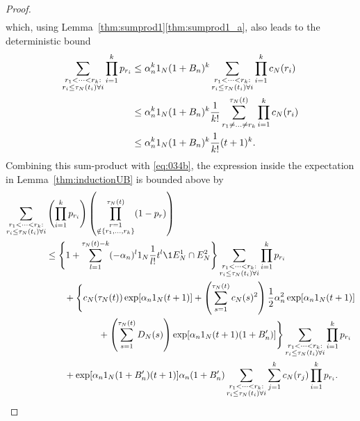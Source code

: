 \begin{proof}
\begin{align}
\end{align}
which, using Lemma~\ref{thm:sumprod1}\ref{thm:sumprod1_a}, also leads to the deterministic bound
\begin{align}
\sum_{\substack{r_1 <\dots< r_k :\\ r_i \leq \tau_N(t_i) \forall i}}
        \prod_{i=1}^k p_{r_i}
&\leq \alpha_n^k 1_N (1 + B_n)^k
        \sum_{\substack{r_1 <\dots< r_k :\\ r_i \leq \tau_N(t_i) \forall i}}
        \prod_{i=1}^k c_N(r_i) \notag\\
&\leq \alpha_n^k 1_N (1 + B_n)^k \frac{1}{k!}
        \sum_{r_1 \neq \dots\neq r_k}^{\tau_N(t)} 
        \prod_{i=1}^k c_N(r_i) \notag\\
&\leq \alpha_n^k 1_N (1 + B_n)^k \frac{1}{k!} (t+1)^k. 
        \label{eq:037}
\end{align}
Combining this sum-product with \eqref{eq:034b}, the expression inside the expectation in Lemma~\ref{thm:inductionUB} is bounded above by
\begin{align*}
\sum_{\substack{r_1 <\dots< r_k :\\ r_i \leq \tau_N(t_i) \forall i}}
        &\left( \prod_{i=1}^k p_{r_i} \right)
        \left( \prod_{\substack{r=1 \\ \notin \{r_1,\dots,r_k\} }}^{\tau_N(t)} 
        (1-p_r) \right) \\
&\leq \Bigg\{ 1+ \sum_{l=1}^{\tau_N(t) -k} (-\alpha_n)^l \ON 
        \frac{1}{l!} t^l \1{E_N^1 \cap E_N^2} \Bigg\}
        \sum_{\substack{r_1 <\dots< r_k :\\ r_i \leq \tau_N(t_i) \forall i}}
        \prod_{i=1}^k p_{r_i} \\
    &\qquad+ \Bigg\{ c_N(\tau_N(t)) 
        \exp[ \alpha_n \ON (t+1) ]
        + \left( \sum_{s=1}^{\tau_N(t)} c_N(s)^2 \right)
        \frac{1}{2} \alpha_n^2 \exp[ \alpha_n \ON (t+1) ] \\
    &\hspace{2cm}+ \left( \sum_{s=1}^{\tau_N(t)} D_N(s) \right)
        \exp[ \alpha_n \ON (t+1) (1+B_n^\prime) ] \Bigg\}
        \sum_{\substack{r_1 <\dots< r_k :\\ r_i \leq \tau_N(t_i) \forall i}}
        \prod_{i=1}^k p_{r_i} \\
    &\qquad+ \exp[ \alpha_n \ON (1 + B_n^\prime) (t+1) ]
        \alpha_n (1 + B_n^\prime)
        \sum_{\substack{r_1 <\dots< r_k :\\ r_i \leq \tau_N(t_i) \forall i}}
        \sum_{j=1}^k c_N(r_j)
        \prod_{i=1}^k p_{r_i} .
\end{align*}

\end{proof}
